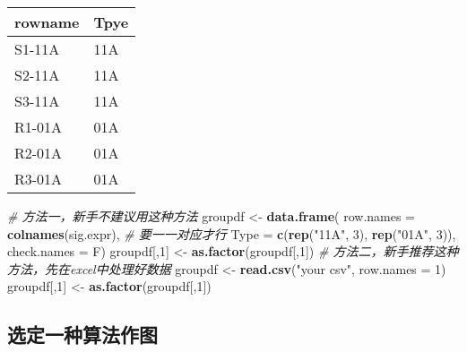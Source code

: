 \documentclass[
]{book}
\newenvironment{Shaded}{\begin{snugshade}}{\end{snugshade}}
\newcommand{\AttributeTok}[1]{\textcolor[rgb]{0.13,0.29,0.53}{#1}}
\newcommand{\CommentTok}[1]{\textcolor[rgb]{0.56,0.35,0.01}{\textit{#1}}}
\newcommand{\DecValTok}[1]{\textcolor[rgb]{0.00,0.00,0.81}{#1}}
\newcommand{\FunctionTok}[1]{\textcolor[rgb]{0.13,0.29,0.53}{\textbf{#1}}}
\newcommand{\NormalTok}[1]{#1}
\newcommand{\OtherTok}[1]{\textcolor[rgb]{0.56,0.35,0.01}{#1}}
\newcommand{\StringTok}[1]{\textcolor[rgb]{0.31,0.60,0.02}{#1}}
\begin{document}
\begin{longtable}[]{@{}ll@{}}
\toprule\noalign{}
rowname & Tpye \\
\midrule\noalign{}
\endhead
\bottomrule\noalign{}
\endlastfoot
S1-11A & 11A \\
S2-11A & 11A \\
S3-11A & 11A \\
R1-01A & 01A \\
R2-01A & 01A \\
R3-01A & 01A \\
\end{longtable}

\begin{Shaded}
\begin{Highlighting}[]
\CommentTok{\# 方法一，新手不建议用这种方法}
\NormalTok{groupdf }\OtherTok{\textless{}{-}} \FunctionTok{data.frame}\NormalTok{(}
  \AttributeTok{row.names =} \FunctionTok{colnames}\NormalTok{(sig.expr),}
  \CommentTok{\# 要一一对应才行}
  \AttributeTok{Type =} \FunctionTok{c}\NormalTok{(}\FunctionTok{rep}\NormalTok{(}\StringTok{"11A"}\NormalTok{, }\DecValTok{3}\NormalTok{), }\FunctionTok{rep}\NormalTok{(}\StringTok{"01A"}\NormalTok{, }\DecValTok{3}\NormalTok{)),}
  \AttributeTok{check.names =}\NormalTok{ F)}
\NormalTok{groupdf[,}\DecValTok{1}\NormalTok{] }\OtherTok{\textless{}{-}} \FunctionTok{as.factor}\NormalTok{(groupdf[,}\DecValTok{1}\NormalTok{])}
\CommentTok{\# 方法二，新手推荐这种方法，先在excel中处理好数据}
\NormalTok{groupdf }\OtherTok{\textless{}{-}} \FunctionTok{read.csv}\NormalTok{(}\StringTok{"your csv"}\NormalTok{, }\AttributeTok{row.names =} \DecValTok{1}\NormalTok{)}
\NormalTok{groupdf[,}\DecValTok{1}\NormalTok{] }\OtherTok{\textless{}{-}} \FunctionTok{as.factor}\NormalTok{(groupdf[,}\DecValTok{1}\NormalTok{])}
\end{Highlighting}
\end{Shaded}

\subsection{选定一种算法作图}\label{ux9009ux5b9aux4e00ux79cdux7b97ux6cd5ux4f5cux56fe}
\end{document}

